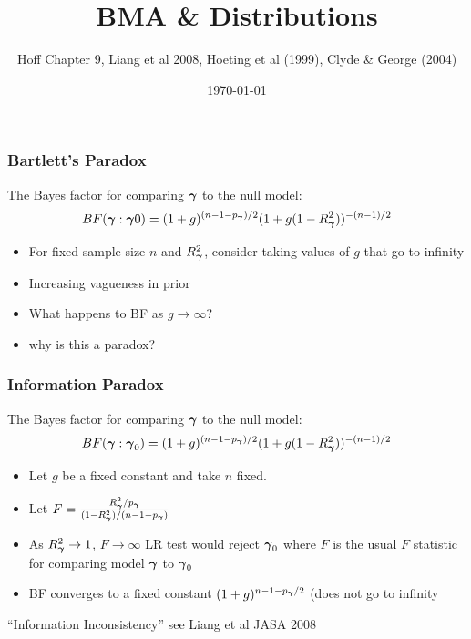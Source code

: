 \documentclass[]{beamer}
\title{BMA \&  Distributions }
\author{Hoff Chapter 9, Liang et al 2008, Hoeting et al (1999), Clyde \&
 George (2004)}
\date{\today}
\begin{document}

\maketitle






\begin{frame} \frametitle{Bartlett's Paradox}


The Bayes factor for comparing $\boldsymbol{\gamma}$ to the null
model:
$$
 BF(\boldsymbol{\gamma} : \boldsymbol{\gamma}0) =    (1 + g)^{(n - 1 - p_{\boldsymbol{\gamma}})/2} (1 + g(1 - R_{\boldsymbol{\gamma}}^2))^{-(n-1)/2}
$$
\pause
\begin{itemize}
\item For fixed sample size $n$ and $R_{\boldsymbol{\gamma}}^2$, consider taking values of  $g$ that
  go to infinity  \pause
\item Increasing vagueness in prior \pause
\item What happens to BF as $g \to \infty$? \pause
\item why is this a paradox?

\end{itemize}
\end{frame}



\begin{frame}
  \frametitle{Information Paradox}

The Bayes factor for comparing $\boldsymbol{\gamma}$ to the null
model:
$$
 BF(\boldsymbol{\gamma} : \boldsymbol{\gamma}_0) =    (1 + g)^{(n - 1 - p_{\boldsymbol{\gamma}})/2} (1 + g(1 - R_{\boldsymbol{\gamma}}^2))^{-(n-1)/2}
$$
\pause
\begin{itemize}
\item Let $g$ be a fixed constant and take $n$ fixed. \pause
\item Let $F = \frac{R_{\boldsymbol{\gamma}}^2/p_{\boldsymbol{\gamma}}}{(1 - R_{\boldsymbol{\gamma}}^2)/(n - 1 - p_{\boldsymbol{\gamma}})}$ \pause
\item As $R^2_{\boldsymbol{\gamma}} \to 1$, $F \to \infty$ LR test would reject $\boldsymbol{\gamma}_0$
  where $F$ is the usual $F$ statistic for  comparing model $\boldsymbol{\gamma}$ to
  $\boldsymbol{\gamma}_0$ \pause
\item BF converges to a fixed constant $(1+g)^{n - 1 -p_{\boldsymbol{\gamma}}/2}$  (does not go
  to infinity 
\end{itemize}

``Information Inconsistency''  see Liang et al JASA 2008


\end{frame}
\end{document}
